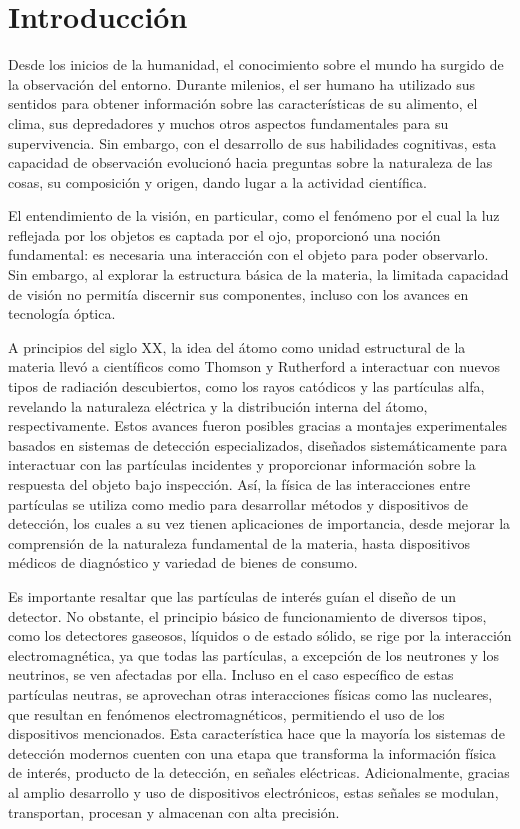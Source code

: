 \documentclass[]{book}
\begin{document}
\chapter{Introducción}

Desde los inicios de la humanidad, el conocimiento sobre el mundo ha surgido de la observación del entorno. Durante milenios, el ser humano ha utilizado sus sentidos para obtener información sobre las características de su alimento, el clima, sus depredadores y muchos otros aspectos fundamentales para su supervivencia. Sin embargo, con el desarrollo de sus habilidades cognitivas, esta capacidad de observación evolucionó hacia preguntas sobre la naturaleza de las cosas, su composición y origen, dando lugar a la actividad científica.

\noindent El entendimiento de la visión, en particular, como el fenómeno por el cual la luz reflejada por los objetos es captada por el ojo, proporcionó una noción fundamental: es necesaria una interacción con el objeto para poder observarlo. Sin embargo, al explorar la estructura básica de la materia, la limitada capacidad de visión no permitía discernir sus componentes, incluso con los avances en tecnología óptica.

\noindent A principios del siglo XX, la idea del átomo como unidad estructural de la materia llevó a científicos como Thomson y Rutherford a interactuar con nuevos tipos de radiación descubiertos, como los rayos catódicos y las partículas alfa, revelando la naturaleza eléctrica y la distribución interna del átomo, respectivamente. Estos avances fueron posibles gracias a montajes experimentales basados en sistemas de detección especializados, diseñados sistemáticamente para interactuar con las partículas incidentes y proporcionar información sobre la respuesta del objeto bajo inspección. Así, la física de las interacciones entre partículas se utiliza como medio para desarrollar métodos y dispositivos de detección, los cuales a su vez tienen aplicaciones de importancia, desde mejorar la comprensión de la naturaleza fundamental de la materia, hasta dispositivos médicos de diagnóstico y variedad de bienes de consumo.

\noindent Es importante resaltar que las partículas de interés guían el diseño de un detector. No obstante, el principio básico de funcionamiento de diversos tipos, como los detectores gaseosos, líquidos o de estado sólido, se rige por la interacción electromagnética, ya que todas las partículas, a excepción de los neutrones y los neutrinos, se ven afectadas por ella. Incluso en el caso específico de estas partículas neutras, se aprovechan otras interacciones físicas como las nucleares, que resultan en fenómenos electromagnéticos, permitiendo el uso de los dispositivos mencionados. Esta característica hace que la mayoría los sistemas de detección modernos cuenten con una etapa que transforma la información física de interés, producto de la detección, en señales eléctricas. Adicionalmente, gracias al amplio desarrollo y uso de dispositivos electrónicos, estas señales se modulan, transportan, procesan y almacenan con alta precisión.
\end{document}
